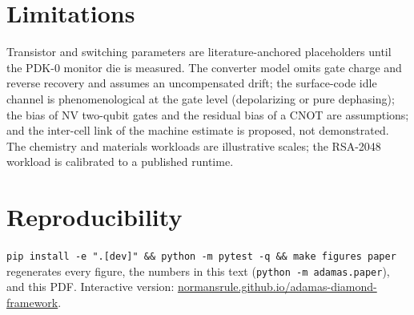 \documentclass[10pt,twocolumn]{article}
\newcommand{\site}{\href{https://normansrule.github.io/adamas-diamond-framework/}{normansrule.github.io/adamas-diamond-framework}}
\begin{document}
\section{Limitations}
Transistor and switching parameters are literature-anchored placeholders until the PDK-0 monitor die is measured. The converter model omits gate charge and reverse recovery and assumes an uncompensated drift; the surface-code idle channel is phenomenological at the gate level (depolarizing or pure dephasing); the bias of NV two-qubit gates and the residual bias of a CNOT are assumptions; and the inter-cell link of the machine estimate is proposed, not demonstrated. The chemistry and materials workloads are illustrative scales; the RSA-2048 workload is calibrated to a published runtime.

\section*{Reproducibility}
\texttt{pip install -e ".[dev]" \&\& python -m pytest -q \&\& make figures paper} regenerates every figure, the numbers in this text (\texttt{python -m adamas.paper}), and this PDF. Interactive version: \site.

\small
\end{document}
